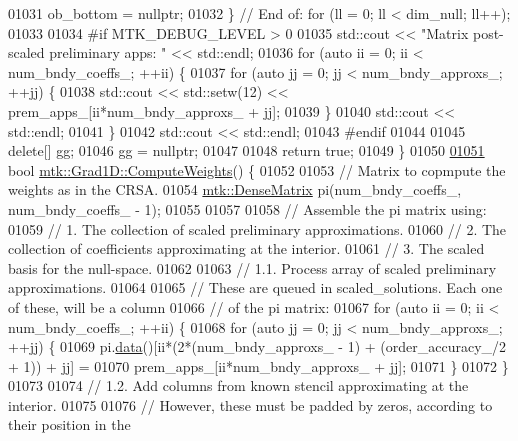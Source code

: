 \begin{DoxyCode}
{{01031     ob\_bottom = \textcolor{keyword}{nullptr};
01032   \} \textcolor{comment}{// End of: for (ll = 0; ll < dim\_null; ll++);}
01033 
01034 \textcolor{preprocessor}{  #if MTK\_DEBUG\_LEVEL > 0}
01035   std::cout << \textcolor{stringliteral}{"Matrix post-scaled preliminary apps: "} << std::endl;
01036   \textcolor{keywordflow}{for} (\textcolor{keyword}{auto} ii = 0; ii < num\_bndy\_coeffs\_; ++ii) \{
01037     \textcolor{keywordflow}{for} (\textcolor{keyword}{auto} jj = 0; jj < num\_bndy\_approxs\_; ++jj) \{
01038       std::cout << std::setw(12) << prem\_apps\_[ii*num\_bndy\_approxs\_ + jj];
01039     \}
01040     std::cout << std::endl;
01041   \}
01042   std::cout << std::endl;
01043 \textcolor{preprocessor}{  #endif}
01044 
01045   \textcolor{keyword}{delete}[] gg;
01046   gg = \textcolor{keyword}{nullptr};
01047 
01048   \textcolor{keywordflow}{return} \textcolor{keyword}{true};
01049 \}
01050 
\hypertarget{mtk__grad__1d_8cc_source_l01051}{}\hyperlink{classmtk_1_1Grad1D_a224082617751864bffca9bfe494c36d5}{01051} \textcolor{keywordtype}{bool} \hyperlink{classmtk_1_1Grad1D_a224082617751864bffca9bfe494c36d5}{mtk::Grad1D::ComputeWeights}() \{
01052 
01053   \textcolor{comment}{// Matrix to copmpute the weights as in the CRSA.}
01054   \hyperlink{classmtk_1_1DenseMatrix}{mtk::DenseMatrix} pi(num\_bndy\_coeffs\_, num\_bndy\_coeffs\_ - 1);
01055 
01057 
01058   \textcolor{comment}{// Assemble the pi matrix using:}
01059   \textcolor{comment}{// 1. The collection of scaled preliminary approximations.}
01060   \textcolor{comment}{// 2. The collection of coefficients approximating at the interior.}
01061   \textcolor{comment}{// 3. The scaled basis for the null-space.}
01062 
01063   \textcolor{comment}{// 1.1. Process array of scaled preliminary approximations.}
01064 
01065   \textcolor{comment}{// These are queued in scaled\_solutions. Each one of these, will be a column}
01066   \textcolor{comment}{// of the pi matrix:}
01067   \textcolor{keywordflow}{for} (\textcolor{keyword}{auto} ii = 0; ii < num\_bndy\_coeffs\_; ++ii) \{
01068     \textcolor{keywordflow}{for} (\textcolor{keyword}{auto} jj = 0; jj < num\_bndy\_approxs\_; ++jj) \{
01069       pi.\hyperlink{classmtk_1_1DenseMatrix_a16b3ff56feb2658b9fc7147d1de4d8e7}{data}()[ii*(2*(num\_bndy\_approxs\_ - 1) + (order\_accuracy\_/2 + 1)) + jj] =
01070         prem\_apps\_[ii*num\_bndy\_approxs\_ + jj];
01071     \}
01072   \}
01073 
01074   \textcolor{comment}{// 1.2. Add columns from known stencil approximating at the interior.}
01075 
01076   \textcolor{comment}{// However, these must be padded by zeros, according to their position in the}
}}
\end{DoxyCode}
